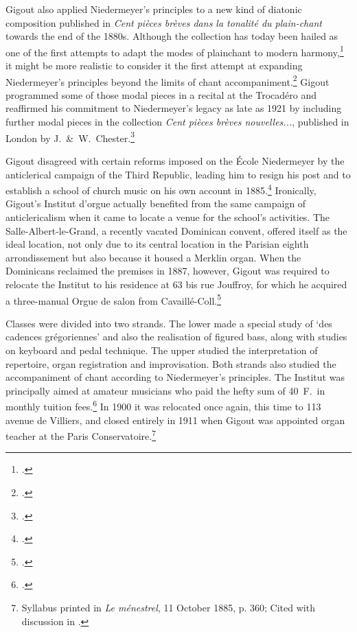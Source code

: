 Gigout also applied Niedermeyer's principles to a new kind of diatonic composition published in \emph{Cent pièces brèves dans la tonalité du plain-chant} towards the end of the 1880s.
Although the collection has today been hailed as one of the first attempts to adapt the modes of plainchant to modern harmony,\footcite[177]{Viretchantgregorientradition2001} it might be more realistic to consider it the first attempt at expanding Niedermeyer's principles beyond the limits of chant accompaniment.\footnote{\covid{}\cite{GigoutCentpiecesbreves1888}.}
Gigout programmed some of those modal pieces in a recital at the Trocadéro and reaffirmed his commitment to Niedermeyer's legacy as late as 1921 by including further modal pieces in the collection \emph{Cent pièces brèves nouvelles...}, published in London by J.~\&~W.~Chester.\footcite[138]{OchseOrganistsOrganPlaying2000}

Gigout disagreed with certain reforms imposed on the École Niedermeyer by the anticlerical campaign of the Third Republic, leading him to resign his post and to establish a school of church music on his own account in 1885.\footcite[The year 1895 is incorrectly provided in][252, probably the result of a typographical error]{HartoppParisConciseMusical2019}
Ironically, Gigout's Institut d'orgue actually benefited from the same campaign of anticlericalism when it came to locate a venue for the school's activities.
The Salle-Albert-le-Grand, a recently vacated Dominican convent, offered itself as the ideal location, not only due to its central location in the Parisian eighth arrondissement but also because it housed a Merklin organ.
When the Dominicans reclaimed the premises in 1887, however, Gigout was required to relocate the Institut to his residence at 63 bis rue Jouffroy, for which he acquired a three-manual Orgue de salon from Cavaillé-Coll.\footcite[83]{Shuster-FournierorguessalonAristide1997}

Classes were divided into two strands.
The lower made a special study of `des cadences grégoriennes' and also the realisation of figured bass, along with studies on keyboard and pedal technique.
The upper studied the interpretation of repertoire, organ registration and improvisation.
Both strands also studied the accompaniment of chant according to Niedermeyer's principles.
The Institut was principally aimed at amateur musicians who paid the hefty sum of 40~F.\ in monthly tuition fees.\footcites[515]{LuedersGigout2003}[Also referenced in][116]{EllisPoliticsPlainchantfindesiecle2013}
In 1900 it was relocated once again, this time to 113 avenue de Villiers, and closed entirely in 1911 when Gigout was appointed organ teacher at the Paris Conservatoire.\footnote{Syllabus printed in \emph{Le ménestrel}, 11 October 1885, p. 360; Cited with discussion in \cite[76--9]{BaileyEugeneGigouthis1994}.}

